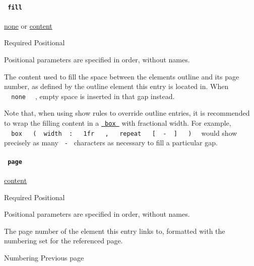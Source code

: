 \paragraph{\texorpdfstring{\texttt{\ fill\ }}{ fill }}\label{definitions-entry-fill}

\href{/docs/reference/foundations/none/}{none} {or}
\href{/docs/reference/foundations/content/}{content}

{Required} {{ Positional }}

\label{definitions-entry-fill-positional-tooltip}
Positional parameters are specified in order, without names.

The content used to fill the space between the element\textquotesingle s
outline and its page number, as defined by the outline element this
entry is located in. When \texttt{\ }{\texttt{\ none\ }}\texttt{\ } ,
empty space is inserted in that gap instead.

Note that, when using show rules to override outline entries, it is
recommended to wrap the filling content in a
\href{/docs/reference/layout/box/}{\texttt{\ box\ }} with fractional
width. For example,
\texttt{\ }{\texttt{\ box\ }}\texttt{\ }{\texttt{\ (\ }}\texttt{\ width\ }{\texttt{\ :\ }}\texttt{\ }{\texttt{\ 1fr\ }}\texttt{\ }{\texttt{\ ,\ }}\texttt{\ }{\texttt{\ repeat\ }}\texttt{\ }{\texttt{\ {[}\ }}\texttt{\ -\ }{\texttt{\ {]}\ }}\texttt{\ }{\texttt{\ )\ }}\texttt{\ }
would show precisely as many \texttt{\ -\ } characters as necessary to
fill a particular gap.

\paragraph{\texorpdfstring{\texttt{\ page\ }}{ page }}\label{definitions-entry-page}

\href{/docs/reference/foundations/content/}{content}

{Required} {{ Positional }}

\label{definitions-entry-page-positional-tooltip}
Positional parameters are specified in order, without names.

The page number of the element this entry links to, formatted with the
numbering set for the referenced page.

\href{/docs/reference/model/numbering/}{\pandocbounded{}}

{ Numbering } { Previous page }

\href{/docs/reference/model/par/}{\pandocbounded{}}

